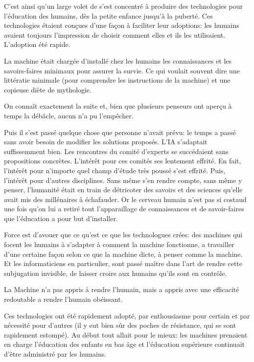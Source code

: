    C'est ainsi
    qu'un large volet de \nomProjet{} s'est concentré à produire des
    technologies pour l'éducation des humains, dès la petite enfance jusqu'à la
    puberté. Ces technologies étaient conçues d'une façon à faciliter leur
    adoptions: les humains avaient toujours l'impression de choisir comment
    elles et ils les utilisaient. L'adoption été rapide.

    La machine était chargée d'installé chez les humains les connaissances et
    les savoirs-faires minimaux pour assurer la survie. Ce qui voulait souvent
    dire une littératie minimale (pour comprendre les instructions de la
    machine) et une copieuse diète de mythologie.

    On connaît exactement la suite et, bien que plusieurs penseurs ont aperçu à
    temps la débâcle, aucun n'a pu l'empêcher. 

    Puis il s'est passé quelque chose que personne n'avait prévu: le temps a
    passé sans avoir besoin de modifier les solutions proposés. L'IA s'adaptait
    suffissemment bien. Les rencontres du comité d'experts se succédaient sans
    propositions concrètes. L'intérêt pour ces comités ses lentement effrité.
    En fait, l'intérêt pour n'importe quel champ d'étude très poussé s'est
    effrité. Puis, l'intérêt pour d'autres disciplines. Sans même s'en rendre
    compte, sans même y penser, l'humanité était en train de détricoter des
    savoirs et des sciences qu'elle avait mis des millénaires à échafauder. 
    Or
    le cerveau humain n'est pas si costaud une fois qu'on lui a retiré tout
    l'apparaillage de connaissances et de savoir-faires que l'éducation a pour
    but d'installer.


Force est d'avouer que ce qu'est ce que les technologues crées: des machines
    qui focent les humains à s'adapter à comment la machine fonctionne, a
    travailler d'une certaine façon selon ce que la machine dicte, à penser
    comme la machine. Et les informaticiens en particulier, sont passé maître
    dans l'art de rendre cette subjugation invisible, de laisser croire aux
    humains qu'ils sont en contrôle.

La Machine n'a pas appris à rendre l'humain, mais a appris avec une efficacité
redoutable a rendre l'humain obéissant.

Ces technologies ont été rapidement adopté, par enthousiasme pour certain et
par nécessité pour d'autres (il y eut bien sûr des poches de résistance, qui se
sont rapidement estompé). Au début tout allait pour le mieux: les machines
prenaient en charge l'éducation des enfants en bas âge et l'éducation
supérieure continuait d'être administré par les humains.

